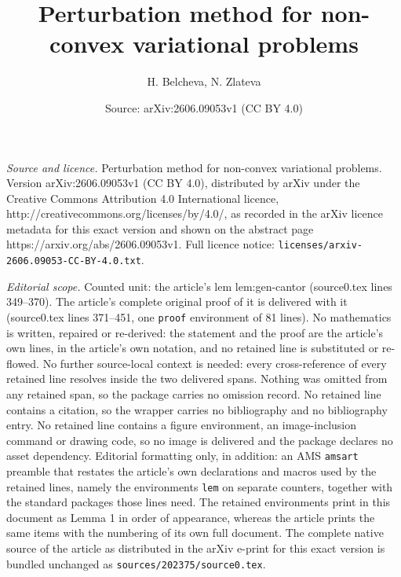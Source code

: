\documentclass[10pt,a4paper]{amsart}
\title{Perturbation method for non-convex variational problems}
\author{H. Belcheva, N. Zlateva}
\date{Source: arXiv:2606.09053v1 (CC BY 4.0)}
\begin{document}
\maketitle

\noindent\emph{Source and licence.} Perturbation method for non-convex variational problems. Version arXiv:2606.09053v1 (CC BY 4.0), distributed by arXiv under the Creative Commons Attribution 4.0 International licence, http://creativecommons.org/licenses/by/4.0/, as recorded in the arXiv licence metadata for this exact version and shown on the abstract page https://arxiv.org/abs/2606.09053v1. Full licence notice: \texttt{licenses/arxiv-2606.09053-CC-BY-4.0.txt}.\par\smallskip

\noindent\textit{Editorial scope.} Counted unit: the article's lem lem:gen-cantor (source0.tex lines 349--370). The article's complete original proof of it is delivered with it (source0.tex lines 371--451, one \texttt{proof} environment of 81 lines). No mathematics is written, repaired or re-derived: the statement and the proof are the article's own lines, in the article's own notation, and no retained line is substituted or re-flowed.  No further source-local context is needed: every cross-reference of every retained line resolves inside the two delivered spans.  Nothing was omitted from any retained span, so the package carries no omission record.  No retained line contains a citation, so the wrapper carries no bibliography and no bibliography entry.  No retained line contains a figure environment, an image-inclusion command or drawing code, so no image is delivered and the package declares no asset dependency.  Editorial formatting only, in addition: an AMS \texttt{amsart} preamble that restates the article's own declarations and macros used by the retained lines, namely the environments \texttt{lem} on separate counters, together with the standard packages those lines need.  The retained environments print in this document as Lemma 1 in order of appearance, whereas the article prints the same items with the numbering of its own full document.  The complete native source of the article as distributed in the arXiv e-print for this exact version is bundled unchanged as \texttt{sources/202375/source0.tex}.
\end{document}
